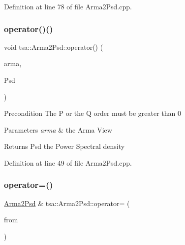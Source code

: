Definition at line 78 of file Arma2\+Psd.\+cpp.

\mbox{\label{classtsa_1_1_arma2_psd_a345f2bf999cad8a585d7fff389bbefa4}} 
\subsubsection{\texorpdfstring{operator()()}{operator()()}}
{\footnotesize\ttfamily void tsa\+::\+Arma2\+Psd\+::operator() (\begin{DoxyParamCaption}\item[{\hyperlink{classtsa_1_1_a_r_m_a_view}{A\+R\+M\+A\+View} \&}]{arma,  }\item[{\hyperlink{namespacetsa_ac599574bcc094eda25613724b8f3ca9e}{Seq\+View\+Double} \&}]{Psd }\end{DoxyParamCaption})}

\begin{DoxyPrecond}{Precondition}
The P or the Q order must be greater than 0
\end{DoxyPrecond}

\begin{DoxyParams}{Parameters}
{\em arma} & the Arma View\\
\hline
\end{DoxyParams}
\begin{DoxyReturn}{Returns}
Psd the Power Spectral density 
\end{DoxyReturn}


Definition at line 49 of file Arma2\+Psd.\+cpp.

\mbox{\label{classtsa_1_1_arma2_psd_a85b4577ccb8331c63c004eb2e917b59b}} 
\subsubsection{\texorpdfstring{operator=()}{operator=()}}
{\footnotesize\ttfamily \hyperlink{classtsa_1_1_arma2_psd}{Arma2\+Psd} \& tsa\+::\+Arma2\+Psd\+::operator= (\begin{DoxyParamCaption}\item[{const \hyperlink{classtsa_1_1_arma2_psd}{Arma2\+Psd} \&}]{from }\end{DoxyParamCaption})}

